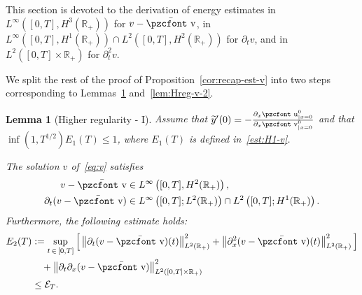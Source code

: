 \documentclass[10pt]{amsart}
\newtheorem{lemm}[theo]{Lemma}\newtheorem{prop}[theo]{Proposition}\newtheorem{coro}[theo]{Corollary}\newtheorem{conj}[theo]{Conjecture}
\theoremstyle{definition}\newtheorem{defi}[theo]{Definition}\newtheorem{rema}[theo]{Remark}\newtheorem{exam}[theo]{Example}\newtheorem{exem}[theo]{Example}\newtheorem{nota}[theo]{Notation}
\newcommand{\mathpzc}[1]{\text{\pzcfont #1}}
\newcommand{\R}{\mathbb{R}}
\newcommand{\p}{\partial}
\newcommand{\bv}{\bar{\mathpzc{v}}}
\newcommand{\cE}{\mathcal E}
\newcommand{\tv}{\mathpzc{v}}
\newcommand{\tu}{\mathpzc{u}}
\newcommand{\ty}{\widetilde{y}}
\begin{document}
This section is devoted to the derivation of energy estimates in $L^\infty([0,T], H^3(\R_+))$ for $v-\bv$, in $L^\infty([0,T], H^1(\R_+))\cap L^2([0,T], H^2(\R_+))$ for $\p_t v$, and in $L^2([0,T]\times \R_+)$ for $\p_t^2 v$.



We split the rest of the proof of Proposition~\ref{cor:recap-est-v} into two steps corresponding to Lemmas~\ref{lem:Hreg-v-1} and~\ref{lem:Hreg-v-2}.

\begin{lemm}[Higher regularity - I]\label{lem:Hreg-v-1}
Assume that $\ty'(0)= - \frac{\p_x \tu^0_{|x=0}}{\partial_x \tv^0_{|x=0}}$ and that $\inf (1,T^{1/2}) E_1(T)\leq 1$, where $E_1(T)$ is defined in~\eqref{est:H1-v}.


The solution $v$ of~\eqref{eq:v} satisfies
\begin{align*}
v -\bv &\in L^\infty\left([0,T], H^2(\R_+)\right),\\
\partial_t(v-\bv) &\in L^\infty\left([0,T];L^2(\R_+)\right) \cap L^2\left([0,T]; H^1(\R_+)\right).
\end{align*}
Furthermore, the following estimate holds:
\begin{equation}\label{est:high-reg-v-I-bis}
\begin{split}
E_2(T)&:=\sup_{t\,\in\,[0,T]} \Big[\left\|\partial_t (v-\bv)(t)\right\|_{L^2(\R_+)}^2 + \left\|\partial^{2}_x(v-\bv)(t)\right\|_{L^2(\R_+)}^2 \Big] \\
&\quad+ \left\| \partial_t \partial_x (v-\bv)\right\|_{L^2([0,T]\times\R_+)}^2 \\& \leq \cE_T.
\end{split}
\end{equation}
\end{lemm}
\end{document}
